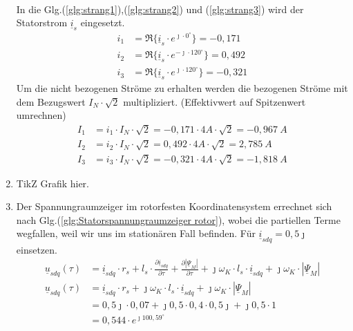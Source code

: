 \begin{solution}
\begin{enumerate}
\begin{align}
\end{align}
In die Glg.(\ref{glg:strang1}),(\ref{glg:strang2}) und (\ref{glg:strang3}) wird der Statorstrom $\underline{i}_s$ eingesetzt.
\begin{align}
i_1 & = \Re \{ \underline{i}_s \cdot e^{\jmath \cdot 0 ^\circ} \} = -0,171\\
i_2 & = \Re \{ \underline{i}_s \cdot e^{-\jmath \cdot 120 ^\circ} \} = 0,492 \\
i_3 & = \Re \{ \underline{i}_s \cdot e^{\jmath \cdot 120 ^\circ} \}=  -0,321
\end{align}
Um die nicht bezogenen Ströme zu erhalten werden die bezogenen Ströme mit dem Bezugswert $I_N \cdot \sqrt{2}$ multipliziert. (Effektivwert auf Spitzenwert umrechnen)
\begin{align}
I_1 & = i_1 \cdot I_N \cdot \sqrt{2} = -0,171 \cdot 4 A \cdot \sqrt{2} =-0,967~A \\
I_2 & = i_2 \cdot I_N \cdot \sqrt{2} = 0,492 \cdot 4 A \cdot \sqrt{2} =2,785~A \\
I_3 & = i_3 \cdot I_N \cdot \sqrt{2} =-0,321 \cdot 4 A \cdot \sqrt{2} =-1,818~A
\end{align}
\item TikZ Grafik hier.
\item Der Spannungraumzeiger im rotorfesten Koordinatensystem errechnet sich nach Glg.(\ref{glg:Statorspannungraumzeiger rotor}), wobei die partiellen Terme wegfallen, weil wir uns im stationären Fall befinden. Für $\underline{i}_{sdq}= 0,5 \jmath$ einsetzen.
\begin{align}
\underline{u}_{sdq}(\tau) &= \underline{i}_{sdq} \cdot r_s + l_s \cdot \frac{\partial \underline{i}_{sdq}}{\partial \tau} + \frac{\partial |\underline{\Psi}_M|}{\partial \tau} + \jmath \omega_K \cdot l_s \cdot \underline{i}_{sdq} + \jmath \omega_K \cdot |\underline{\Psi}_M|\\
\underline{u}_{sdq}(\tau) &= \underline{i}_{sdq} \cdot r_s + \jmath \omega_K \cdot l_s \cdot \underline{i}_{sdq} + \jmath \omega_K \cdot |\underline{\Psi}_M|\\
&= 0,5 \jmath \cdot 0,07 + \jmath 0,5 \cdot 0,4 \cdot 0,5 \jmath +\jmath 0,5 \cdot 1\\
&=0,544 \cdot e^{\jmath 100,59^\circ}
\end{align}
\end{enumerate}
\end{solution}